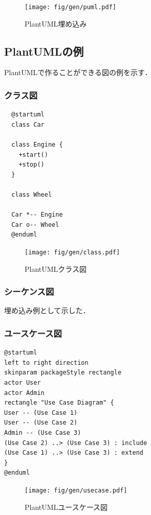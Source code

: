 \documentclass[main]{subfiles}
\begin{document}
\begin{figure}[H]
  \centering
  \texttt{[image: fig/gen/puml.pdf]}
  \caption{PlantUML埋め込み}
  \label{fig:pumlinclude}
\end{figure}

\subsection{PlantUMLの例}
PlantUMLで作ることができる図の例を示す．

\subsubsection{クラス図}

\begin{verbatim}
  @startuml
  class Car

  class Engine {
    +start()
    +stop()
  }

  class Wheel

  Car *-- Engine
  Car o-- Wheel
  @enduml
\end{verbatim}

\begin{figure}[H]
  \centering
  \texttt{[image: fig/gen/class.pdf]}
  \caption{PlantUMLクラス図}
  \label{fig:pumlclass}
\end{figure}

\subsubsection{シーケンス図}
埋め込み例として示した．

\subsubsection{ユースケース図}

\begin{verbatim}
@startuml
left to right direction
skinparam packageStyle rectangle
actor User
actor Admin
rectangle "Use Case Diagram" {
User -- (Use Case 1)
User -- (Use Case 2)
Admin -- (Use Case 3)
(Use Case 2) ..> (Use Case 3) : include
(Use Case 1) ..> (Use Case 3) : extend
}
@enduml
\end{verbatim}

\begin{figure}[H]
  \centering
  \texttt{[image: fig/gen/usecase.pdf]}
  \caption{PlantUMLユースケース図}
  \label{fig:pumlusecase}
\end{figure}
\end{document}
